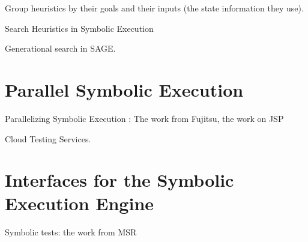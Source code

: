 Group heuristics by their goals and their inputs (the state information they use).

Search Heuristics in Symbolic Execution

Generational search in SAGE.


\section{Parallel Symbolic Execution}

Parallelizing Symbolic Execution : The work from Fujitsu, the work on JSP

Cloud Testing Services.


\section{Interfaces for the Symbolic Execution Engine}

Symbolic tests: the work from MSR


